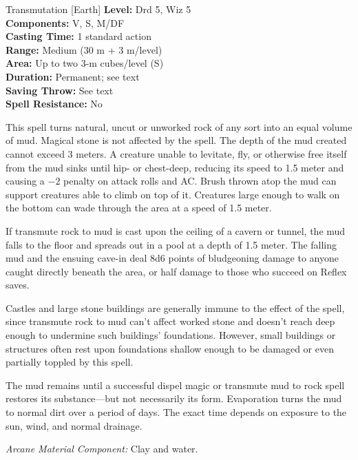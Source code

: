 {Transmutation [Earth]}
{
	\textbf{Level:}
	Drd 5, Wiz 5\\
	\textbf{Components:}
	V, S, M/DF\\
	\textbf{Casting Time:}
	1 standard action\\
	\textbf{Range:}
	Medium (30 m + 3 m/level)\\
	\textbf{Area:}
	Up to two 3-m cubes/level (S)\\
	\textbf{Duration:}
	Permanent; see text\\
	\textbf{Saving Throw:}
	See text\\
	\textbf{Spell Resistance:}
	No\\
}
{
	This spell turns natural, uncut or unworked rock of any sort into an equal volume of mud. Magical stone is not affected by the spell. The depth of the mud created cannot exceed 3 meters. A creature unable to levitate, fly, or otherwise free itself from the mud sinks until hip- or chest-deep, reducing its speed to 1.5 meter and causing a $-2$ penalty on attack rolls and AC. Brush thrown atop the mud can support creatures able to climb on top of it. Creatures large enough to walk on the bottom can wade through the area at a speed of 1.5 meter.

	If transmute rock to mud is cast upon the ceiling of a cavern or tunnel, the mud falls to the floor and spreads out in a pool at a depth of 1.5 meter. The falling mud and the ensuing cave-in deal 8d6 points of bludgeoning damage to anyone caught directly beneath the area, or half damage to those who succeed on Reflex saves.

	Castles and large stone buildings are generally immune to the effect of the spell, since transmute rock to mud can't affect worked stone and doesn't reach deep enough to undermine such buildings' foundations. However, small buildings or structures often rest upon foundations shallow enough to be damaged or even partially toppled by this spell.

	The mud remains until a successful dispel magic or transmute mud to rock spell restores its substance---but not necessarily its form. Evaporation turns the mud to normal dirt over a period of days. The exact time depends on exposure to the sun, wind, and normal drainage.

	\textit{Arcane Material Component:}
	Clay and water.

}
